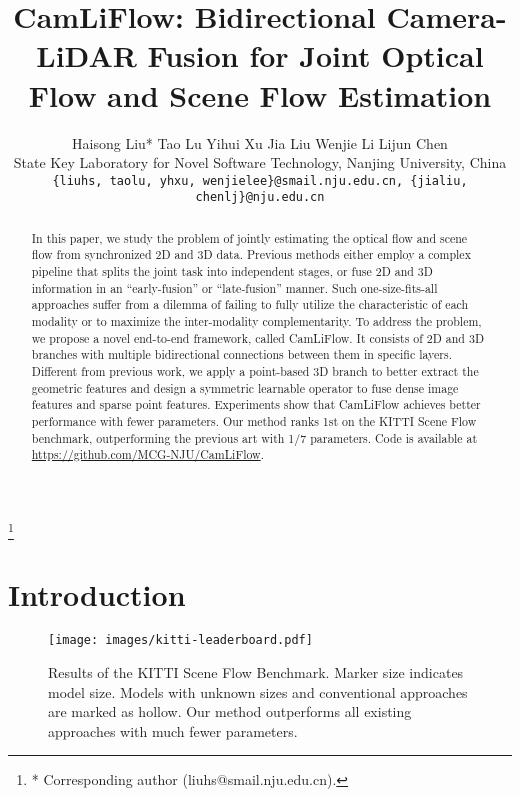 \documentclass[10pt,twocolumn,letterpaper]{article}
\newcommand\blfootnote[1]{\begingroup
  \renewcommand\thefootnote{}\footnote{#1}\addtocounter{footnote}{-1}\endgroup
}
\begin{document}
\title{CamLiFlow: Bidirectional Camera-LiDAR Fusion for Joint Optical Flow and Scene Flow Estimation}

\author{
Haisong Liu* \quad Tao Lu \quad Yihui Xu \quad Jia Liu \quad Wenjie Li \quad Lijun Chen\\
State Key Laboratory for Novel Software Technology, Nanjing University, China\\
\small\texttt{\{liuhs, taolu, yhxu, wenjielee\}@smail.nju.edu.cn, \{jialiu, chenlj\}@nju.edu.cn}
}



\maketitle

\begin{abstract}
In this paper, we study the problem of jointly estimating the optical flow and scene flow from synchronized 2D and 3D data. Previous methods either employ a complex pipeline that splits the joint task into independent stages, or fuse 2D and 3D information in an ``early-fusion'' or ``late-fusion'' manner. Such one-size-fits-all approaches suffer from a dilemma of failing to fully utilize the characteristic of each modality or to maximize the inter-modality complementarity. To address the problem, we propose a novel end-to-end framework, called CamLiFlow. It consists of 2D and 3D branches with multiple bidirectional connections between them in specific layers. Different from previous work, we apply a point-based 3D branch to better extract the geometric features and design a symmetric learnable operator to fuse dense image features and sparse point features. Experiments show that CamLiFlow achieves better performance with fewer parameters. Our method ranks 1st on the KITTI Scene Flow benchmark, outperforming the previous art with 1/7 parameters. Code is available at \url{https://github.com/MCG-NJU/CamLiFlow}.
\end{abstract}


\blfootnote{* Corresponding author (liuhs@smail.nju.edu.cn).}


\vspace{-20pt}

\section{Introduction}

\begin{figure}[t]
    \hspace*{0.45cm}
    \texttt{[image: images/kitti-leaderboard.pdf]}
    \vspace{-5pt}
    \caption{Results of the KITTI Scene Flow Benchmark. Marker size indicates model size. Models with unknown sizes and conventional approaches are marked as hollow. Our method outperforms all existing approaches \cite{menze2015osf,ren2017ssf,vogel2015prsm,behl2017isf,ma2019drisf,jiang2019sense,yang2020opticalexp,teed2021raft3d,yang2021rigidmask} with much fewer parameters.}
    \vspace{-16pt}
    \label{fig:kitti-leaderboard}
\end{figure}
\end{document}
